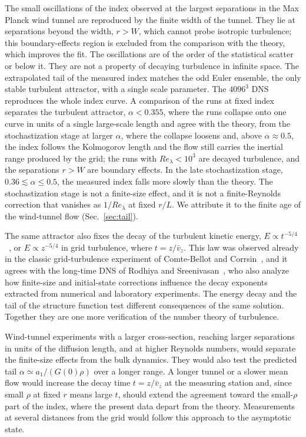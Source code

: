 \documentclass[aip,pof,preprint,floatfix,nofootinbib,amsmath,amssymb]{revtex4-2}
\begin{document}
The small oscillations of the index observed at the largest separations in the Max Planck wind tunnel are reproduced by the
finite width of the tunnel. They lie at separations beyond the width, $r>W$, which cannot probe isotropic turbulence; this
boundary-effects region is excluded from the comparison with the theory, which improves the fit. The oscillations are of the
order of the statistical scatter or below it. They are not a property of decaying turbulence in infinite space. The extrapolated tail of
the measured index matches the odd Euler ensemble, the only stable turbulent attractor, with a single scale parameter. The
$4096^3$ DNS reproduces the whole index curve. A comparison of the runs at fixed index separates the turbulent attractor,
$\alpha<0.355$, where the runs collapse onto one curve in units of a single large-scale length and agree with the theory, from
the stochastization stage at larger $\alpha$, where the collapse loosens and, above $\alpha\approx0.5$, the index follows the
Kolmogorov length and the flow still carries the inertial range produced by the grid; the runs with $Re_\lambda<10^3$ are
decayed turbulence, and the separations $r>W$ are boundary effects. In the late stochastization stage, $0.36\lesssim\alpha\le0.5$, the measured index falls more slowly than
the theory. The stochastization stage is not a
finite-size effect, and it is not a finite-Reynolds correction that vanishes as $1/Re_\lambda$ at fixed $r/L$. We attribute it to
the finite age of the wind-tunnel flow (Sec.~\ref{sec:tail}).

The same attractor also fixes the decay of the turbulent kinetic energy, $E\propto t^{-5/4}$~\cite{migdal2024quantum},
or $E\propto z^{-5/4}$ in grid turbulence, where $t=z/\bar v_z$. This law was observed already in the classic grid-turbulence
experiment of Comte-Bellot and Corrsin~\cite{GridTurbulence_1966}, and it agrees with the long-time DNS of Rodhiya and
Sreenivasan~\cite{SreeniAkash2025}, who also analyze how finite-size and initial-state corrections influence the decay
exponents extracted from numerical and laboratory experiments. The energy decay and the tail of the structure function test
different consequences of the same solution. Together they are one more verification of the number theory of turbulence.

Wind-tunnel experiments with a larger cross-section, reaching larger separations in units of the diffusion length, and at
higher Reynolds numbers, would separate the finite-size effects from the bulk dynamics. They would also test the predicted
tail $\alpha\simeq a_1/(G(0)\rho)$ over a longer range. A longer tunnel or a slower mean flow would increase the decay time
$t=z/\bar v_z$ at the measuring station and, since small $\rho$ at fixed $r$ means large $t$, should extend the agreement
toward the small-$\rho$ part of the index, where the present data depart from the theory. Measurements at several distances
from the grid would follow this approach to the asymptotic state.
\end{document}
